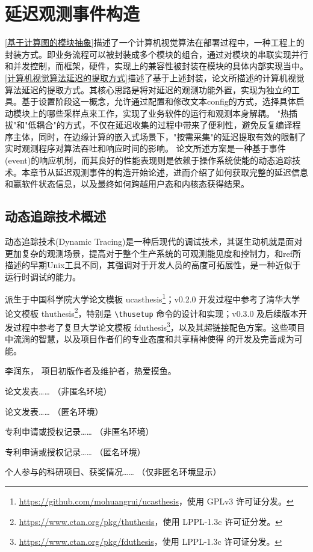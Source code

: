 \documentclass[master]{shtthesis}
\makeatletter
\def\ifgraduate{\ifsht@graduate}
\makeatother
\begin{document}
\section{延迟观测事件构造}
\ref{基于计算图的模块抽象}描述了一个计算机视觉算法在部署过程中，一种工程上的封装方式。即业务流程可以被封装成多个模块的组合，通过对模块的串联实现并行和并发控制，而框架，硬件，实现上的兼容性被封装在模块的具体内部实现当中。
\ref{计算机视觉算法延迟的提取方式}描述了基于上述封装，论文所描述的计算机视觉算法延迟的提取方式。其核心思路是将对延迟的观测功能外置，实现为独立的工具。基于设置阶段这一概念，允许通过配置和修改文本config的方式，选择具体启动模块上的哪些采样点来工作，实现了业务软件的运行和观测本身解耦。
"热插拔"和"低耦合"的方式，不仅在延迟收集的过程中带来了便利性，避免反复编译程序主体，同时，在边缘计算的嵌入式场景下，"按需采集"的延迟提取有效的限制了实时观测程序对算法吞吐和响应时间的影响。
论文所述方案是一种基于事件(event)的响应机制，而其良好的性能表现则是依赖于操作系统使能的动态追踪技术。本章节从延迟观测事件的构造开始论述，进而介绍了如何获取完整的延迟信息和赢软件状态信息，以及最终如何跨越用户态和内核态获得结果。
\subsection{动态追踪技术概述}
动态追踪技术(Dynamic Tracing)是一种后现代的调试技术，其诞生动机就是面对更加复杂的观测场景，提高对于整个生产系统的可观测能见度和控制力，和ref所描述的早期Unix工具不同，其强调对于开发人员的高度可拓展性，是一种近似于运行时调试的能力。


\begin{acknowledgement}
\shtthesis{} 派生于中国科学院大学论文模板 \textsf{ucasthesis}\footnote{\url{https://github.com/mohuangrui/ucasthesis}，使用 GPLv3 许可证分发。}；v0.2.0 开发过程中参考了清华大学论文模板 \textsf{thuthesis}\footnote{\url{https://www.ctan.org/pkg/thuthesis}，使用 LPPL-1.3c 许可证分发。}，特别是 \verb|\thusetup| 命令的设计和实现；v0.3.0 及后续版本开发过程中参考了复旦大学论文模板 \textsf{fduthesis}\footnote{\url{https://www.ctan.org/pkg/fduthesis}，使用 LPPL-1.3c 许可证分发。}，以及其超链接配色方案。这些项目中流淌的智慧，以及项目作者们的专业态度和共享精神使得 \shtthesis{} 的开发及完善成为可能。
\end{acknowledgement}
\makebiblio
\ifgraduate
\begin{resume}
  李润东，\shtthesis{} 项目初版作者及维护者，热爱摸鱼。
\end{resume}

\begin{publications}
  论文发表…… （非匿名环境）
\end{publications}

\begin{publications*}
  论文发表…… （匿名环境）
\end{publications*}

\begin{patents}
  专利申请或授权记录…… （非匿名环境）
\end{patents}

\begin{patents*}
  专利申请或授权记录…… （匿名环境）
\end{patents*}

\begin{projects}
  个人参与的科研项目、获奖情况…… （仅非匿名环境显示）
\end{projects}
\fi
\end{document}
